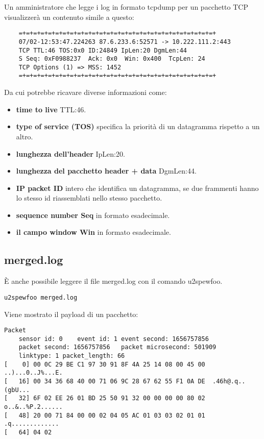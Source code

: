 Un amministratore che legge i log in formato tcpdump per un pacchetto TCP visualizzerà un contenuto simile a questo:

\begin{verbatim}
    =+=+=+=+=+=+=+=+=+=+=+=+=+=+=+=+=+=+=+=+=+=+=+=+=+=+=+
    07/02-12:53:47.224263 87.6.233.6:52571 -> 10.222.111.2:443
    TCP TTL:46 TOS:0x0 ID:24849 IpLen:20 DgmLen:44
    S Seq: 0xF0988237  Ack: 0x0  Win: 0x400  TcpLen: 24
    TCP Options (1) => MSS: 1452
    =+=+=+=+=+=+=+=+=+=+=+=+=+=+=+=+=+=+=+=+=+=+=+=+=+=+=+
    \end{verbatim}

Da cui potrebbe ricavare diverse informazioni come:
\begin{itemize}
    \item \textbf{time to live} TTL:46.
    \item \textbf{type of service (TOS)} specifica la priorità di un datagramma rispetto a un altro.
    \item \textbf{lunghezza dell'header} IpLen:20.
    \item \textbf{lunghezza del pacchetto header + data} DgmLen:44.
    \item \textbf{IP packet ID} intero che identifica un datagramma, se due frammenti hanno lo stesso id riassemblati nello stesso pacchetto.
    \item \textbf{sequence number Seq} in formato esadecimale.
    \item \textbf{il campo window Win} in formato esadecimale.
\end{itemize}

\subsection{merged.log}

È anche possibile leggere il file merged.log con il comando u2spewfoo.

\begin{verbatim}
u2spewfoo merged.log
\end{verbatim}

Viene mostrato il payload di un pacchetto:

\begin{verbatim}
Packet
	sensor id: 0	event id: 1	event second: 1656757856
	packet second: 1656757856	packet microsecond: 501909
	linktype: 1	packet_length: 66
[    0] 00 0C 29 BE C1 97 30 91 8F 4A 25 14 08 00 45 00  ..)...0..J%...E.
[   16] 00 34 36 68 40 00 71 06 9C 28 67 62 55 F1 0A DE  .46h@.q..(gbU...
[   32] 6F 02 EE 26 01 BD 25 50 91 32 00 00 00 00 80 02  o..&..%P.2......
[   48] 20 00 71 84 00 00 02 04 05 AC 01 03 03 02 01 01   .q.............
[   64] 04 02
\end{verbatim}


